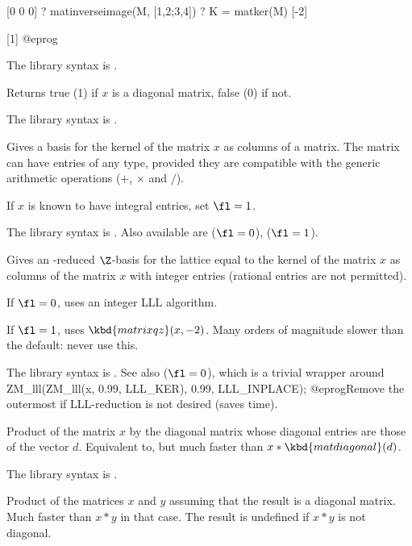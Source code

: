 [0 0 0]
? matinverseimage(M, [1,2;3,4])
? K = matker(M)
[-2]

[1]
@eprog

The library syntax is .

\label{se:matisdiagonal}
Returns true (1) if $x$ is a diagonal matrix, false (0) if not.

The library syntax is .

\label{se:matker}
Gives a basis for the kernel of the matrix $x$ as columns of a matrix.
The matrix can have entries of any type, provided they are compatible with
the generic arithmetic operations ($+$, $\times$ and $/$).

If $x$ is known to have integral entries, set $\fl=1$.

The library syntax is .
Also available are  ($\fl=0$),
 ($\fl=1$).

\label{se:matkerint}
Gives an -reduced $\Z$-basis
for the lattice equal to the kernel of the matrix $x$ as columns of the
matrix $x$ with integer entries (rational entries are not permitted).

If $\fl=0$, uses an integer LLL algorithm.

If $\fl=1$, uses $\kbd{matrixqz}(x,-2)$. Many orders of magnitude slower
than the default: never use this.

The library syntax is .
See also  ($\fl=0$), which is a trivial
wrapper around
\bprog
ZM_lll(ZM_lll(x, 0.99, LLL_KER), 0.99, LLL_INPLACE);
@eprog\noindent Remove the outermost  if LLL-reduction is not
desired (saves time).

\label{se:matmuldiagonal}
Product of the matrix $x$ by the diagonal
matrix whose diagonal entries are those of the vector $d$. Equivalent to,
but much faster than $x*\kbd{matdiagonal}(d)$.

The library syntax is .

\label{se:matmultodiagonal}
Product of the matrices $x$ and $y$ assuming that the result is a
diagonal matrix. Much faster than $x*y$ in that case. The result is
undefined if $x*y$ is not diagonal.

